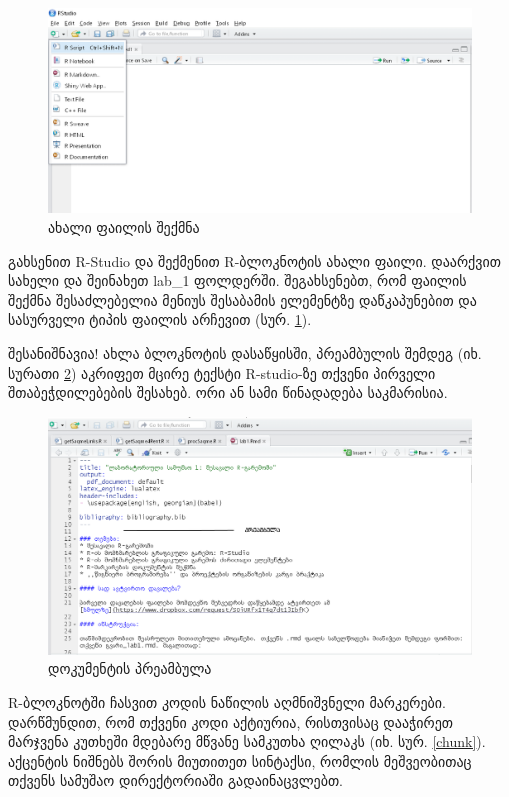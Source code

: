 \documentclass{article}\usepackage[]{graphicx}\usepackage[]{color}
\begin{document}
\begin{figure}[h]
\centering
\includegraphics[width=\textwidth]{img/new_menu.PNG}
\caption{ახალი ფაილის შექმნა}
    \label{create:file}
\end{figure}

გახსენით R-Studio და შექმენით R-ბლოკნოტის ახალი ფაილი. დაარქვით სახელი და შეინახეთ lab\_1 ფოლდერში. შეგახსენებთ, რომ ფაილის შექმნა შესაძლებელია მენიუს შესაბამის ელემენტზე დაწკაპუნებით და სასურველი ტიპის ფაილის არჩევით (სურ. \ref{create:file}).




შესანიშნავია! ახლა ბლოკნოტის დასაწყისში, პრეამბულის შემდეგ (იხ. სურათი \ref{preamble}) აკრიფეთ მცირე ტექსტი R-studio-ზე თქვენი პირველი შთაბეჭდილებების შესახებ. ორი ან სამი წინადადება საკმარისია.

\begin{figure}[h]
\centering
\includegraphics[width=\textwidth]{img/preamble.PNG}
\caption{დოკუმენტის პრეამბულა}
    \label{preamble}
\end{figure}

R-ბლოკნოტში ჩასვით კოდის ნაწილის აღმნიშვნელი მარკერები. დარწმუნდით, რომ თქვენი კოდი აქტიურია, რისთვისაც დააჭირეთ მარჯვენა კუთხეში მდებარე მწვანე სამკუთხა ღილაკს (იხ. სურ. \ref{chunk}). აქცენტის ნიშნებს შორის მიუთითეთ სინტაქსი, რომლის მეშვეობითაც თქვენს სამუშაო დირექტორიაში გადაინაცვლებთ.
\end{document}
